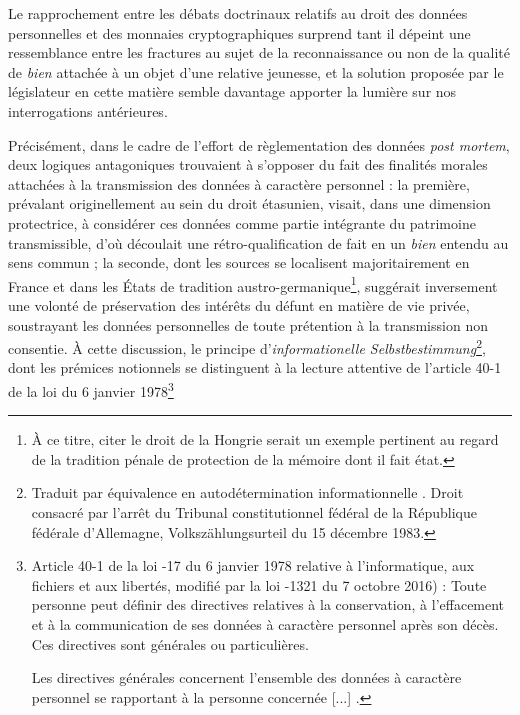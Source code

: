 {Le rapprochement entre les débats doctrinaux relatifs au droit des données personnelles et des monnaies cryptographiques surprend tant il dépeint une ressemblance entre les fractures au sujet de la reconnaissance ou non de la qualité de \emph{bien} attachée à un objet d'une relative jeunesse, et la solution proposée par le législateur en cette matière semble davantage apporter la lumière sur nos interrogations antérieures.\par

Précisément, dans le cadre de l'effort de règlementation des données \emph{post mortem}, deux logiques antagoniques trouvaient à s'opposer du fait des finalités morales attachées à la transmission des données à caractère personnel : la première, prévalant originellement au sein du droit étasunien, visait, dans une dimension protectrice, à considérer ces données comme partie intégrante du patrimoine transmissible, d'où découlait une rétro-qualification de fait en un \emph{bien} entendu au sens commun ; la seconde, dont les sources se localisent majoritairement en France et dans les États de tradition austro-germanique\footnote{À ce titre, citer le droit de la Hongrie serait un exemple pertinent au regard de la tradition pénale de protection de la mémoire dont il fait état.}, suggérait inversement une volonté de préservation des intérêts du défunt en matière de vie privée, soustrayant les données personnelles de toute prétention à la transmission non consentie. À cette discussion, le principe d'\emph{informationelle Selbstbestimmung}\footnote{Traduit par équivalence en \og autodétermination informationnelle \fg{}. Droit consacré par l'arrêt du Tribunal constitutionnel fédéral de la République fédérale d'Allemagne, \og Volkszählungsurteil \fg{} du 15 décembre 1983.}, dont les prémices notionnels se distinguent à la lecture attentive de l'article 40-1 de la loi du 6 janvier 1978\footnote{Article 40-1 de la loi -17 du 6 janvier 1978 relative à l'informatique, aux fichiers et aux libertés, modifié par la loi -1321 du 7 octobre 2016) : \og Toute personne peut définir des directives relatives à la conservation, à l'effacement et à la communication de ses données à caractère personnel après son décès. Ces directives sont générales ou particulières.\par
Les directives générales concernent l'ensemble des données à caractère personnel se rapportant à la personne concernée [...] \fg{}.
}}
